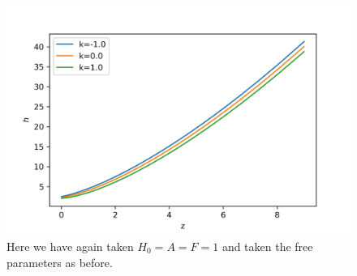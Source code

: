 \documentclass[a4paper, 11pt]{FSKH_623_Report}
\numberwithin{equation}{section}
\begin{document}
\begin{figure}[H]
\centering
\includegraphics[scale=1]{Figures/UDF_H.jpg}
\caption{Here we have again taken $H_{0}=A=F=1$ and taken the free parameters as before.}
\label{fig:UDFh}
\end{figure}
\end{document}
